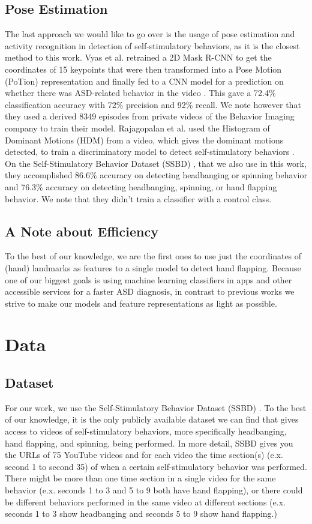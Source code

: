 \documentclass{article}
\begin{document}
\subsection{Pose Estimation}
The last approach we would like to go over is the usage of pose estimation and activity recognition in detection of self-stimulatory behaviors, as it is the closest method to this work. Vyas et al. retrained a 2D Mask R-CNN \cite{girdhar2018detecttrack} to get the coordinates of 15 keypoints that were then transformed into a Pose Motion (PoTion) representation \cite{8578832} and finally fed to a CNN model for a prediction on whether there was ASD-related behavior in the video \cite{8918863}. This gave a 72.4\% classification accuracy with 72\% precision and 92\% recall. We note however that they used a derived 8349 episodes from private videos of the Behavior Imaging company to train their model. Rajagopalan et al. used the Histogram of Dominant Motions (HDM) from a video, which gives the dominant motions detected, to train a discriminatory model to detect self-stimulatory behaviors \cite{7025294}. On the Self-Stimulatory Behavior Dataset (SSBD) \cite{6755972}, that we also use in this work, they accomplished 86.6\% accuracy on detecting headbanging or spinning behavior and 76.3\% accuracy on detecting headbanging, spinning, or hand flapping behavior. We note that they didn't train a classifier with a control class. 

\subsection{A Note about Efficiency}
To the best of our knowledge, we are the first ones to use just the coordinates of (hand) landmarks as features to a single model to detect hand flapping. Because one of our biggest goals is using machine learning classifiers in apps and other accessible services for a faster ASD diagnosis, in contrast to previous works we strive to make our models and feature representations as light as possible. 

\section{Data}

\subsection{Dataset}

For our work, we use the Self-Stimulatory Behavior Dataset (SSBD) \cite{6755972}. To the best of our knowledge, it is the only publicly available dataset we can find that gives access to videos of self-stimulatory behaviors, more specifically headbanging, hand flapping, and spinning, being performed. In more detail, SSBD gives you the URLs of 75 YouTube videos and for each video the time section(s) (e.x. second 1 to second 35) of when a certain self-stimulatory behavior was performed. There might be more than one time section in a single video for the same behavior (e.x. seconds 1 to 3 and 5 to 9 both have hand flapping), or there could be different behaviors performed in the same video at different sections (e.x. seconds 1 to 3 show headbanging and seconds 5 to 9 show hand flapping.) 
\end{document}
